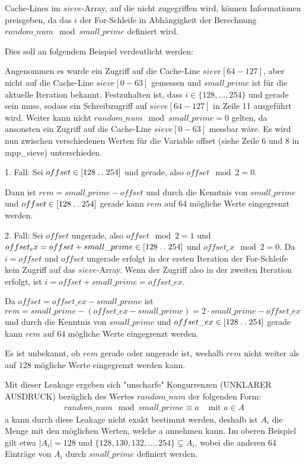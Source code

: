 Cache-Lines im $sieve$-Array, auf die nicht zugegriffen wird, können Informationen preisgeben, da das $i$ der For-Schleife in Abhängigkeit der Berechnung $random\_num \mod small\_prime$ definiert wird.

Dies soll an folgendem Beispiel verdeutlicht werden:

Angenommen es wurde ein Zugriff auf die Cache-Line $sieve[64-127]$, aber nicht auf die Cache-Line $sieve[0-63]$ gemessen und $small\_prime$ ist für die aktuelle Iteration bekannt. Festzuhalten ist, dass $i \in \{128,...,254\}$ und gerade sein muss, sodass ein Schreibzugriff auf $sieve[64-127]$ in Zeile 11 ausgeführt wird.
Weiter kann nicht $random\_num \mod small\_prime = 0$ gelten, da ansonsten ein Zugriff auf die Cache-Line $sieve[0-63]$ messbar wäre. 
Es wird nun zwischen verschiedenen Werten für die Variable offset (siehe Zeile 6 und 8 in mpp_sieve) unterschieden.

1. Fall: Sei $offset \in [128\mathrel{{.}\,{.}}\nobreak254]$ und gerade, also $offset \mod 2 = 0$. 

Dann ist $rem = small\_prime - offset$ und durch die Kenntnis von $small\_prime$ und $offset \in [128\mathrel{{.}\,{.}}\nobreak254]$ gerade kann $rem$ auf 64 mögliche Werte eingegrenzt werden.

2. Fall: Sei $offset$ ungerade, also $offset \mod 2 = 1$ und $offset_ex = offset + small\_prime \in [128\mathrel{{.}\,{.}}\nobreak254]$ und $offset_ex \mod 2 = 0$. Da $i=offset$ und $offset$ ungerade erfolgt in der ersten Iteration der For-Schleife kein Zugriff auf das $sieve$-Array. Wenn der Zugriff also in der zweiten Iteration erfolgt, ist $i = offset + small\_prime = offset\_ex$.

Da $offset = offset\_ex - small\_prime$ ist $rem = small\_prime - (offset\_ex - small\_prime) = 2 \cdot small\_prime - offset\_ex$ und durch die Kenntnis von $small\_prime$ und $offset\_ex \in [128\mathrel{{.}\,{.}}\nobreak254]$ gerade kann $rem$ auf 64 mögliche Werte eingegrenzt werden.

Es ist unbekannt, ob $rem$ gerade oder ungerade ist, weshalb $rem$ nicht weiter als auf 128 mögliche Werte eingegrenzt werden kann.

Mit dieser Leakage ergeben sich "unscharfe" Kongurrenzen (UNKLARER AUSDRUCK) bezüglich des Wertes $random\_num$ der folgenden Form:
\begin{align}
    random\_num \mod small\_prime \equiv a &\text{ mit } a \in A
\end{align}
a kann durch diese Leakage nicht exakt bestimmt werden, deshalb ist $A_i$ die Menge mit den möglichen Werten, welche a annehmen kann.
Im oberen Beispiel gilt etwa $|A_i| = 128$ und $\{128,130,132,...,254\} \subsetneq A_i$, wobei die anderen 64 Einträge von $A_i$ durch $small\_prime$ definiert werden.


